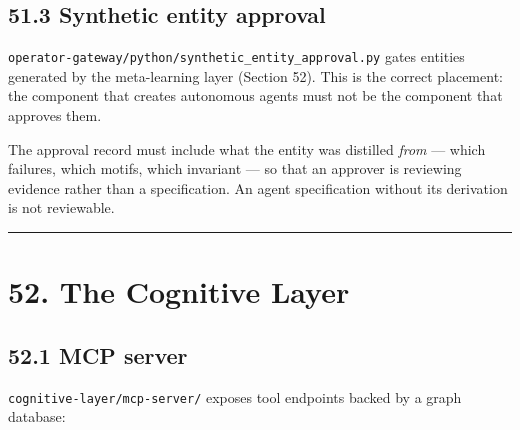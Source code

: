 \documentclass[
  11pt]{report}
\begin{document}
\hypertarget{synthetic-entity-approval}{%
\section{51.3 Synthetic entity
approval}\label{synthetic-entity-approval}}

\texttt{operator-gateway/python/synthetic\_entity\_approval.py} gates
entities generated by the meta-learning layer (Section 52). This is the
correct placement: the component that creates autonomous agents must not
be the component that approves them.

The approval record must include what the entity was distilled
\emph{from} --- which failures, which motifs, which invariant --- so
that an approver is reviewing evidence rather than a specification. An
agent specification without its derivation is not reviewable.

\begin{center}\rule{0.5\linewidth}{0.5pt}\end{center}

\hypertarget{the-cognitive-layer}{%
\chapter{52. The Cognitive Layer}\label{the-cognitive-layer}}

\hypertarget{mcp-server}{%
\section{52.1 MCP server}\label{mcp-server}}

\texttt{cognitive-layer/mcp-server/} exposes tool endpoints backed by a
graph database:
\end{document}
